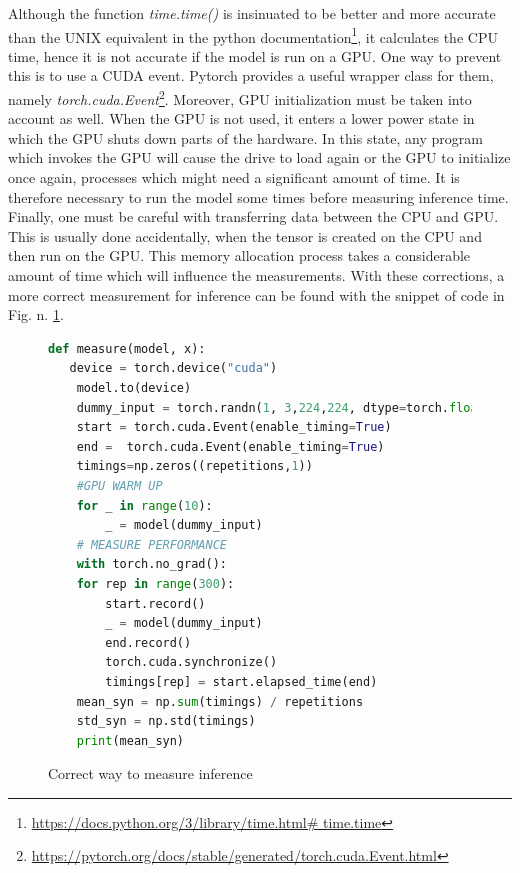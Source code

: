Although the function \textit{time.time()} is insinuated to be better and more accurate than the UNIX equivalent in the python documentation\footnote{ \url{https://docs.python.org/3/library/time.html\# time.time} }, it calculates the CPU time, hence it is not accurate if the model is run on a GPU. One way to prevent this is to use a CUDA event. Pytorch provides a useful wrapper class for them, namely \textit{torch.cuda.Event}\footnote{ \url{https://pytorch.org/docs/stable/generated/torch.cuda.Event.html} }. Moreover, GPU initialization must be taken into account as well. When the GPU is not used, it enters a lower power state in which the GPU shuts down parts of the hardware. In this state, any program which invokes the GPU will cause the drive to load again or the GPU to initialize once again, processes which might need a significant amount of time. It is therefore necessary to run the model some times before measuring inference time. \cite{Correct_inference_measure}
Finally, one must be careful with transferring data between the CPU and GPU. This is usually done accidentally, when the tensor is created on the CPU and then run on the GPU. This memory allocation process takes a considerable amount of time which will influence the measurements. \cite{Correct_inference_measure}
With these corrections, a more correct measurement for inference can be found with the snippet of code in Fig. n. \ref{fig:corr_inf}.\\
\begin{figure}[h]
\begin{lstlisting}[language=python]
def measure(model, x):
   device = torch.device("cuda")
    model.to(device)
    dummy_input = torch.randn(1, 3,224,224, dtype=torch.float).to(device)
    start = torch.cuda.Event(enable_timing=True)
    end =  torch.cuda.Event(enable_timing=True)
    timings=np.zeros((repetitions,1))
    #GPU WARM UP
    for _ in range(10):
        _ = model(dummy_input)
    # MEASURE PERFORMANCE
    with torch.no_grad():
    for rep in range(300):
        start.record()
        _ = model(dummy_input)
        end.record()
        torch.cuda.synchronize()
        timings[rep] = start.elapsed_time(end)
    mean_syn = np.sum(timings) / repetitions
    std_syn = np.std(timings)
    print(mean_syn)

\end{lstlisting}
\caption{Correct way to measure inference}
\label{fig:corr_inf}
\end{figure}


